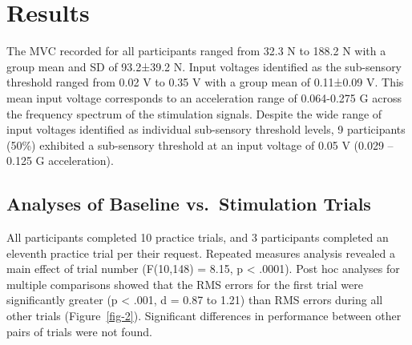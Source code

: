\documentclass[]{cik}%
\begin{document}
\hypertarget{results}{%
\section{Results}\label{results}}

The MVC recorded for all participants ranged from 32.3 N to 188.2 N with
a group mean and SD of 93.2±39.2 N. Input voltages identified as the
sub-sensory threshold ranged from 0.02 V to 0.35 V with a group mean of
0.11±0.09 V. This mean input voltage corresponds to an acceleration
range of 0.064-0.275 G across the frequency spectrum of the stimulation
signals. Despite the wide range of input voltages identified as
individual sub-sensory threshold levels, 9 participants (50\%) exhibited
a sub-sensory threshold at an input voltage of 0.05 V (0.029 -- 0.125 G
acceleration).

\hypertarget{analyses-of-baseline-vs.-stimulation-trials}{%
\subsection{Analyses of Baseline vs.~Stimulation
Trials}\label{analyses-of-baseline-vs.-stimulation-trials}}

All participants completed 10 practice trials, and 3 participants
completed an eleventh practice trial per their request. Repeated
measures analysis revealed a main effect of trial number (F(10,148) =
8.15, p \textless{} .0001). Post hoc analyses for multiple comparisons
showed that the RMS errors for the first trial were significantly
greater (p \textless{} .001, d = 0.87 to 1.21) than RMS errors during
all other trials (Figure~\ref{fig-2}). Significant differences in
performance between other pairs of trials were not found.
\end{document}
